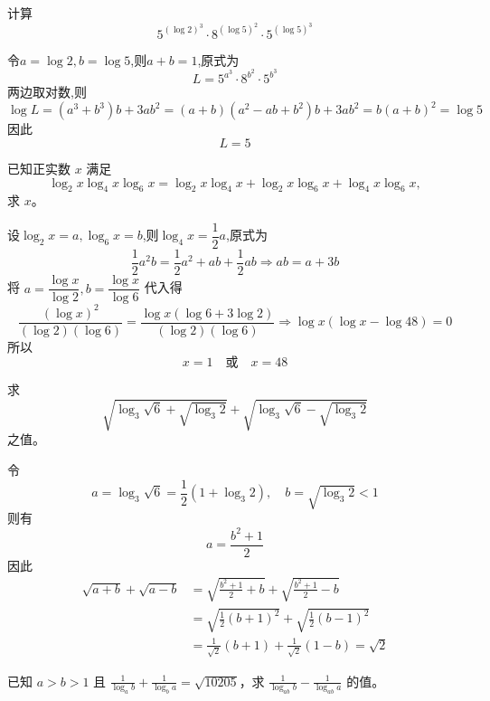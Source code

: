 \begin{questions}
    \question 计算
    \[
    5^{(\log 2)^3} \cdot 8^{(\log 5)^2} \cdot 5^{(\log 5)^3}
    \]
    \begin{solution}
        令$a=\log 2,b=\log 5$,则$a+b=1$,原式为
        \[
        L=5^{a^3}\cdot 8^{b^2} \cdot 5^{b^3}
        \]
        两边取对数,则
        \[
        \log L 
        = (a^3 + b^3)b + 3ab^2 
        = (a+b)(a^2-ab+b^2) b + 3ab^2 
        = b(a+b)^2 
        = \log 5
        \]
        因此
        \[
        L = 5
        \]
    \end{solution}

    \question 已知正实数 $x$ 满足
    \[
    \log_2 x\log_4 x\log_6 x = \log_2 x\log_4 x+\log_2 x\log_6 x+\log_4 x\log_6 x,
    \]
    求 $x$。
    \begin{solution}
        设$\log_2 x=a, \log_6 x=b$,则$\log_4 x=\dfrac{1}{2}a$,原式为
        \[
        \frac{1}{2}a^2 b = \frac{1}{2}a^2 + ab + \frac{1}{2}ab
        \Rightarrow ab = a + 3b
        \]
        将 $a=\dfrac{\log x}{\log 2},b=\dfrac{\log x}{\log 6}$ 代入得
        \[
        \frac{(\log x)^2}{(\log 2)(\log 6)}
        = \frac{\log x(\log 6+3\log 2)}{(\log 2)(\log 6)} \Rightarrow \log x(\log x-\log 48)=0
        \]
        所以
        \[
        x=1\quad\text{或}\quad x=48
        \]
    \end{solution}

    \question 求
    \[
    \sqrt{\log_3 \sqrt{6} + \sqrt{\log_3 2}} + \sqrt{\log_3 \sqrt{6} - \sqrt{\log_3 2}}
    \]
    之值。
    \begin{solution}
        令
        \[
        a = \log_3 \sqrt{6} = \frac{1}{2} (1 + \log_3 2), \quad 
        b = \sqrt{\log_3 2} < 1
        \]
        则有
        \[
        a = \frac{b^2 + 1}{2}
        \]
        因此
        \begin{align*}
        \sqrt{a+b} + \sqrt{a-b} &= \sqrt{\frac{b^2+1}{2} + b} + \sqrt{\frac{b^2+1}{2} - b} \\
        &= \sqrt{\frac{1}{2} (b+1)^2} + \sqrt{\frac{1}{2} (b-1)^2} \\
        &= \frac{1}{\sqrt{2}} (b+1) + \frac{1}{\sqrt{2}} (1-b) = \sqrt{2}
        \end{align*}
    \end{solution}

    \question 已知 $a > b > 1$ 且 $\frac{1}{\log_a b} + \frac{1}{\log_b a} = \sqrt{10205}$，求 $\frac{1}{\log_{ab} b} - \frac{1}{\log_{ab} a}$ 的值。


\end{questions}
